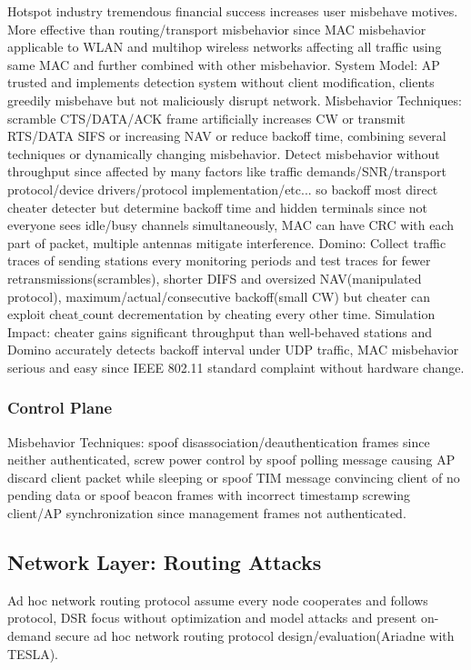 \documentclass[9pt]{extarticle}
\begin{document}
\begin{multicols}{2}
Hotspot industry tremendous financial success increases user misbehave motives. More effective than routing/transport misbehavior since MAC misbehavior applicable to WLAN and multihop wireless networks affecting all traffic using same MAC and further combined with other misbehavior. System Model: AP trusted and implements detection system without client modification, clients greedily misbehave but not maliciously disrupt network. Misbehavior Techniques: scramble CTS/DATA/ACK frame artificially increases CW or transmit RTS/DATA SIFS or increasing NAV or reduce backoff time, combining several techniques or dynamically changing misbehavior. Detect misbehavior without throughput since affected by many factors like traffic demands/SNR/transport protocol/device drivers/protocol implementation/etc... so backoff most direct cheater detecter but determine backoff time and hidden terminals since not everyone sees idle/busy channels simultaneously, MAC can have CRC with each part of packet, multiple antennas mitigate interference. Domino: Collect traffic traces of sending stations every monitoring periods and test traces for fewer retransmissions(scrambles), shorter DIFS and oversized NAV(manipulated protocol), maximum/actual/consecutive backoff(small CW) but cheater can exploit cheat$\_$count decrementation by cheating every other time. Simulation Impact: cheater gains significant throughput than well-behaved stations and Domino accurately detects backoff interval under UDP traffic, MAC misbehavior serious and easy since IEEE 802.11 standard complaint without hardware change.

\subsubsection{Control Plane}

Misbehavior Techniques: spoof disassociation/deauthentication frames since neither authenticated, screw power control by spoof polling message causing AP discard client packet while sleeping or spoof TIM message convincing client of no pending data or spoof beacon frames with incorrect timestamp screwing client/AP synchronization since management frames not authenticated.

\subsection{Network Layer: Routing Attacks}

Ad hoc network routing protocol assume every node cooperates and follows protocol, DSR focus without optimization and model attacks and present on-demand secure ad hoc network routing protocol design/evaluation(Ariadne with TESLA). 


\end{multicols}
\end{document}

